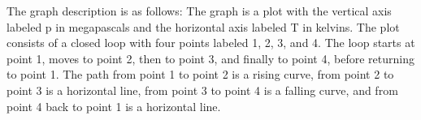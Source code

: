 The graph description is as follows: The graph is a plot with the vertical axis labeled p in megapascals and the horizontal axis labeled T in kelvins. The plot consists of a closed loop with four points labeled 1, 2, 3, and 4. The loop starts at point 1, moves to point 2, then to point 3, and finally to point 4, before returning to point 1. The path from point 1 to point 2 is a rising curve, from point 2 to point 3 is a horizontal line, from point 3 to point 4 is a falling curve, and from point 4 back to point 1 is a horizontal line.